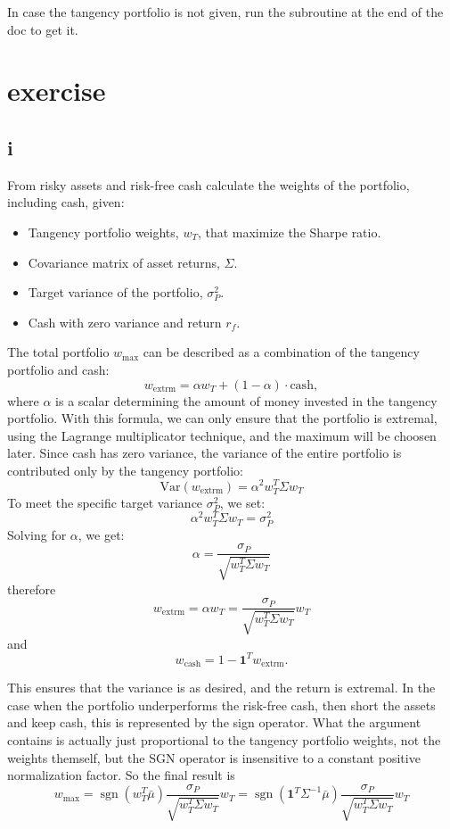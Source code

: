 \documentclass{article}
\DeclareMathOperator{\sgn}{sgn}
\begin{document}
In case the tangency portfolio is not given,
run the subroutine at the end of the doc to get it.

\section{exercise}
\subsection*{i}
From risky assets and risk-free cash calculate the weights of the portfolio, including cash, given:
\begin{itemize}
    \item Tangency portfolio weights, \( w_T \), that maximize the Sharpe ratio.
    \item Covariance matrix of asset returns, \( \Sigma \).
    \item Target variance of the portfolio, \( \sigma_P^2 \).
    \item Cash with zero variance and return \( r_f \).
\end{itemize}

The total portfolio \( w_{\text{max}} \) can be described as a combination of the tangency portfolio and cash:
\[ w_{\text{extrm}} = \alpha w_T + (1 - \alpha) \cdot \text{cash},\]
where \( \alpha \) is a scalar determining the amount of money invested in the tangency portfolio.
With this formula, we can only ensure that the portfolio is extremal,
using the Lagrange multiplicator technique,
and the maximum will be choosen later.
Since cash has zero variance,
the variance of the entire portfolio is contributed only by the tangency portfolio:
\[ \text{Var}(w_{\text{extrm}}) = \alpha^2 w_T^T \Sigma w_T \]
To meet the specific target variance \( \sigma_P^2 \), we set:
\[ \alpha^2 w_T^T \Sigma w_T = \sigma_P^2 \]
Solving for \( \alpha \), we get:
\[ \alpha = \frac{\sigma_P}{\sqrt{w_T^T \Sigma w_T}} \]
therefore
\[ w_{\text{extrm}} = \alpha w_T = \frac{\sigma_P}{\sqrt{w_T^T \Sigma w_T}} w_T\]
and
\[ w_{\text{cash}} = 1 - \mathbf{1}^T w_{\text{extrm}}.\]

This ensures that the variance is as desired, and the return is extremal.
In the case when the portfolio underperforms the risk-free cash,
then short the assets and keep cash, this is represented by the sign operator.
What the argument contains is actually just proportional to the tangency portfolio weights,
not the weights themself,
but the SGN operator is insensitive to a constant positive normalization factor.
So the final result is
\[ w_{\text{max}} = \sgn\left(w_T^T\bar\mu\right) \frac{\sigma_P}{\sqrt{w_T^T \Sigma w_T}} w_T = \sgn\left(\mathbf{1}^T\Sigma^{-1}\bar\mu\right) \frac{\sigma_P}{\sqrt{w_T^T \Sigma w_T}} w_T\]
\end{document}
